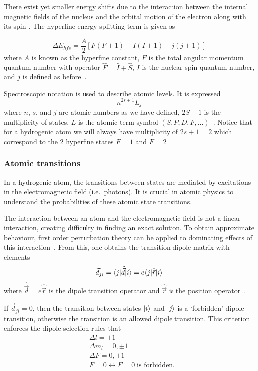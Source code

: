 \documentclass[aps,pra,showpacs,amsmath,amssymb,nofootinbib,longbibliography,superscriptaddress
]{revtex4-1}
\DeclarePairedDelimiter\bra{\langle}{\rvert}
\DeclarePairedDelimiter\ket{\lvert}{\rangle}
\theoremstyle{definition}
\theoremstyle{remark}
\newcommand{\0}{\hat{0}}
\begin{document}
There exist yet smaller energy shifts due to the interaction between the internal magnetic fields of the nucleus and the orbital motion of the electron along with its spin \cite{McIntyre}. The hyperfine energy splitting term is given as

    \begin{equation}\label{hyperfine}
        \Delta E_{hfs} = \frac{A}{2} \left[ F(F+1) - I(I+1) - j(j+1) \right]
    \end{equation}
where $A$ is known as the hyperfine constant, $F$ is the total angular momentum quantum number with operator $\hat F = \hat I + \hat S$, $I$ is the nuclear spin quantum number, and $j$ is defined as before~\cite{Tong}\cite{McIntyre}.

Spectroscopic notation is used to describe atomic levels. It is expressed
\begin{equation}
    n^{2s+1}L_j
\end{equation}
where $n$, $s$, and $j$ are atomic numbers as we have defined, $2S+1$ is the multiplicity of states, $L$ is the atomic term symbol $(S, P, D, F, \ldots)$~\cite{Atomic}. Notice that for a hydrogenic atom we will always have multiplicity of $2s+1=2$ which correspond to the 2 hyperfine states $F=1$ and $F=2$

\subsubsection{Atomic transitions}

In a hydrogenic atom, the transitions between states are mediated by excitations in the electromagnetic field (i.e.~photons). It is crucial in atomic physics to understand the probabilities of these atomic state transitions.

The interaction between an atom and the electromagnetic field is not a linear interaction, creating difficulty in finding an exact solution. To obtain approximate behaviour, first order perturbation theory can be applied to dominating effects of this interaction~\cite{Atomic}. From this, one obtains the transition dipole matrix with elements
\begin{equation}
    \vec{d}_{ji} = \bra{j}\hat{\vec{d}}\ket{i} = e\bra{j}\hat{\vec{r}}\ket{i}
\end{equation}
where $\hat{\vec{d}} = e\hat{\vec{r}}$ is the dipole transition operator and $\hat{\vec{r}}$ is the position operator~\cite{Atomic}.

If $\vec{d}_{ji} = 0$, then the transition between states $\ket{i}$ and $\ket{j}$ is a `forbidden' dipole transition, otherwise the transition is an allowed dipole transition. This criterion enforces the dipole selection rules that~\cite{Atomic}
\begin{align}
    &\Delta l = \pm 1 \label{TransitionRule1}\\
    &\Delta m_l = 0, \pm 1 \label{TransitionRule2}\\
    &\Delta F = 0, \pm 1 \label{TransitionRule3}\\
    & F = 0 \leftrightarrow F = 0 \;\text{is forbidden}. \label{TransitionRule4}
\end{align}
\end{document}

